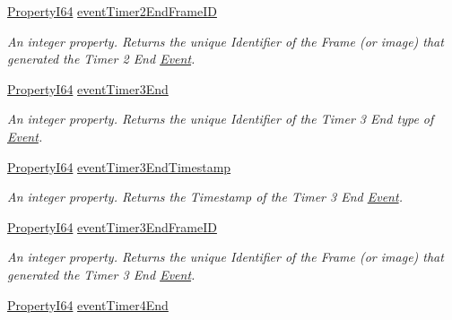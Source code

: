 \begin{DoxyCompactItemize}
\hyperlink{group___common_interface_ga81749b2696755513663492664a18a893}{Property\+I64} \hyperlink{classmv_i_m_p_a_c_t_1_1acquire_1_1_gen_i_cam_1_1_event_control_a17f48d4a5736b1a5539c120934b76282}{event\+Timer2\+End\+Frame\+I\+D}
\begin{DoxyCompactList}\small\item\em An integer property. Returns the unique Identifier of the Frame (or image) that generated the Timer 2 End \hyperlink{classmv_i_m_p_a_c_t_1_1acquire_1_1_event}{Event}. \end{DoxyCompactList}\item 
\hyperlink{group___common_interface_ga81749b2696755513663492664a18a893}{Property\+I64} \hyperlink{classmv_i_m_p_a_c_t_1_1acquire_1_1_gen_i_cam_1_1_event_control_a69e279c62085a05dd42a394fed8bfd5a}{event\+Timer3\+End}
\begin{DoxyCompactList}\small\item\em An integer property. Returns the unique Identifier of the Timer 3 End type of \hyperlink{classmv_i_m_p_a_c_t_1_1acquire_1_1_event}{Event}. \end{DoxyCompactList}\item 
\hyperlink{group___common_interface_ga81749b2696755513663492664a18a893}{Property\+I64} \hyperlink{classmv_i_m_p_a_c_t_1_1acquire_1_1_gen_i_cam_1_1_event_control_ad4d6da22c32e8fb5750b8e252f793d83}{event\+Timer3\+End\+Timestamp}
\begin{DoxyCompactList}\small\item\em An integer property. Returns the Timestamp of the Timer 3 End \hyperlink{classmv_i_m_p_a_c_t_1_1acquire_1_1_event}{Event}. \end{DoxyCompactList}\item 
\hyperlink{group___common_interface_ga81749b2696755513663492664a18a893}{Property\+I64} \hyperlink{classmv_i_m_p_a_c_t_1_1acquire_1_1_gen_i_cam_1_1_event_control_aeee2694df0f2197fdf167edac768b60d}{event\+Timer3\+End\+Frame\+I\+D}
\begin{DoxyCompactList}\small\item\em An integer property. Returns the unique Identifier of the Frame (or image) that generated the Timer 3 End \hyperlink{classmv_i_m_p_a_c_t_1_1acquire_1_1_event}{Event}. \end{DoxyCompactList}\item 
\hyperlink{group___common_interface_ga81749b2696755513663492664a18a893}{Property\+I64} \hyperlink{classmv_i_m_p_a_c_t_1_1acquire_1_1_gen_i_cam_1_1_event_control_abc14d9df3f58e60d47568e4571ae155d}{event\+Timer4\+End}

\end{DoxyCompactItemize}
